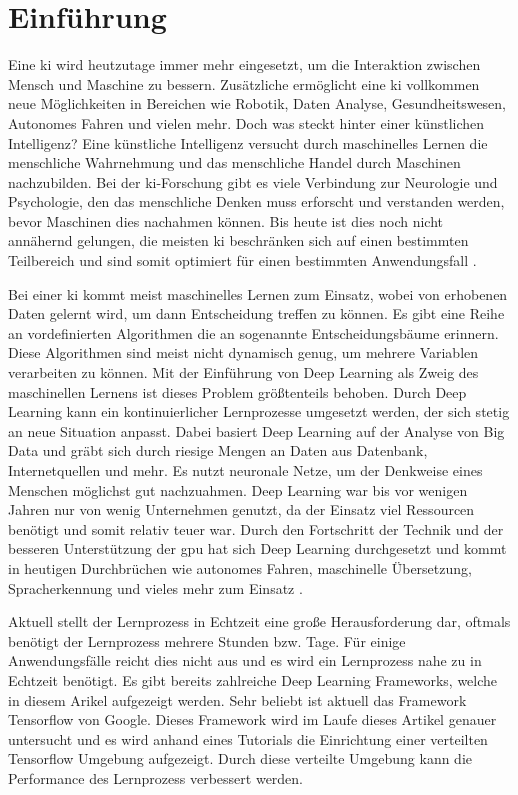 \section{Einführung}
Eine \ac{ki} wird heutzutage immer mehr eingesetzt, um die Interaktion zwischen Mensch und Maschine zu bessern. Zusätzliche ermöglicht eine \ac{ki} vollkommen neue Möglichkeiten in Bereichen wie Robotik, Daten Analyse, Gesundheitswesen, Autonomes Fahren und vielen mehr. Doch was steckt hinter einer künstlichen Intelligenz? Eine künstliche Intelligenz versucht durch maschinelles Lernen die menschliche Wahrnehmung und das menschliche Handel durch Maschinen nachzubilden. Bei der \ac{ki}-Forschung gibt es viele Verbindung zur Neurologie und Psychologie, den das menschliche Denken muss erforscht und verstanden werden, bevor Maschinen dies nachahmen können. Bis heute ist dies noch nicht annähernd gelungen, die meisten \ac{ki} beschränken sich auf einen bestimmten Teilbereich und sind somit optimiert für einen bestimmten Anwendungsfall \cite{PlanetWissenKI}. \newline

Bei einer \ac{ki} kommt meist maschinelles Lernen zum Einsatz, wobei von erhobenen Daten gelernt wird, um dann Entscheidung treffen zu können. Es gibt eine Reihe an vordefinierten Algorithmen die an sogenannte Entscheidungsbäume erinnern. Diese Algorithmen sind meist nicht dynamisch genug, um mehrere Variablen verarbeiten zu können. Mit der Einführung von Deep Learning als Zweig des maschinellen Lernens ist dieses Problem größtenteils behoben. Durch Deep Learning kann ein kontinuierlicher Lernprozesse umgesetzt werden, der sich stetig an neue Situation anpasst. Dabei basiert Deep Learning auf der Analyse von Big Data und gräbt sich durch riesige Mengen an Daten aus Datenbank, Internetquellen und mehr. Es nutzt neuronale Netze, um der Denkweise eines Menschen möglichst gut nachzuahmen. Deep Learning war bis vor wenigen Jahren nur von wenig Unternehmen genutzt, da der Einsatz viel Ressourcen benötigt und somit relativ teuer war. Durch den Fortschritt der Technik und der besseren Unterstützung der \ac{gpu} hat sich Deep Learning durchgesetzt und kommt in heutigen Durchbrüchen wie autonomes Fahren, maschinelle Übersetzung, Spracherkennung und vieles mehr zum Einsatz \cite{BigDataInsiderDeepLearning}. \newline

Aktuell stellt der Lernprozess in Echtzeit eine große Herausforderung dar, oftmals benötigt der Lernprozess mehrere Stunden bzw. Tage. Für einige Anwendungsfälle reicht dies nicht aus und es wird ein Lernprozess nahe zu in Echtzeit benötigt. Es gibt bereits zahlreiche Deep Learning Frameworks, welche in diesem Arikel aufgezeigt werden. Sehr beliebt ist aktuell das Framework Tensorflow von Google. Dieses Framework wird im Laufe dieses Artikel genauer untersucht und es wird anhand eines Tutorials die Einrichtung einer verteilten Tensorflow Umgebung aufgezeigt. Durch diese verteilte Umgebung kann die Performance des Lernprozess verbessert werden.  
